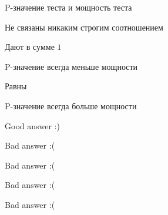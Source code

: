 
\begin{question}
P-значение теста и мощность теста
\begin{answerlist}
  \item Не связаны никаким строгим соотношением
  \item Дают в сумме \(1\)
  \item P-значение всегда меньше мощности
  \item Равны
  \item P-значение всегда больше мощности
\end{answerlist}
\end{question}

\begin{solution}
\begin{answerlist}
  \item Good answer :)
  \item Bad answer :(
  \item Bad answer :(
  \item Bad answer :(
  \item Bad answer :(
\end{answerlist}
\end{solution}

